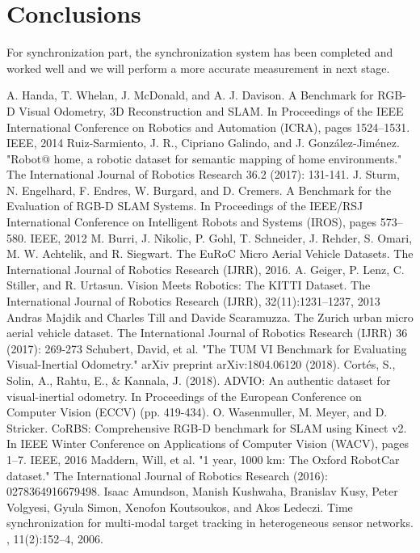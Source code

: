\documentclass[conference]{IEEEtran}
\begin{document}
	\section{Conclusions}
	For synchronization part, the synchronization system has been completed and worked well and we will perform a more accurate measurement in next stage.
	
	\begin{thebibliography}{00}
		 A. Handa, T. Whelan, J. McDonald, and A. J. Davison. A Benchmark for RGB-D Visual Odometry, 3D Reconstruction and SLAM. In Proceedings of the IEEE International Conference on Robotics and Automation (ICRA), pages 1524–1531. IEEE, 2014
		 Ruiz-Sarmiento, J. R., Cipriano Galindo, and J. González-Jiménez. "Robot@ home, a robotic dataset for semantic mapping of home environments." The International Journal of Robotics Research 36.2 (2017): 131-141.
		 J. Sturm, N. Engelhard, F. Endres, W. Burgard, and D. Cremers. A Benchmark for the Evaluation of RGB-D SLAM Systems. In Proceedings of the IEEE/RSJ International Conference on Intelligent Robots and Systems (IROS), pages 573–580. IEEE, 2012
		 M. Burri, J. Nikolic, P. Gohl, T. Schneider, J. Rehder, S. Omari, M. W. Achtelik, and R. Siegwart. The EuRoC Micro Aerial Vehicle Datasets. The International Journal of Robotics Research (IJRR), 2016.
		 A. Geiger, P. Lenz, C. Stiller, and R. Urtasun. Vision Meets Robotics: The KITTI Dataset. The International Journal of Robotics Research (IJRR), 32(11):1231–1237, 2013
		 Andras Majdik and Charles Till and Davide Scaramuzza. The Zurich urban micro aerial vehicle dataset. The International Journal of Robotics Research (IJRR) 36 (2017): 269-273
		 Schubert, David, et al. "The TUM VI Benchmark for Evaluating Visual-Inertial Odometry." arXiv preprint arXiv:1804.06120 (2018).
		 Cortés, S., Solin, A., Rahtu, E., \& Kannala, J. (2018). ADVIO: An authentic dataset for visual-inertial odometry. In Proceedings of the European Conference on Computer Vision (ECCV) (pp. 419-434).
		 O. Wasenmuller, M. Meyer, and D. Stricker. CoRBS: Comprehensive RGB-D benchmark for SLAM using Kinect v2. In IEEE Winter Conference on Applications of Computer Vision (WACV), pages 1–7. IEEE, 2016
		 Maddern, Will, et al. "1 year, 1000 km: The Oxford RobotCar dataset." The International Journal of Robotics Research (2016): 0278364916679498. 
		Isaac Amundson, Manish Kushwaha, Branislav Kusy, Peter Volgyesi, Gyula Simon,
		Xenofon Koutsoukos, and Akos Ledeczi.
		\newblock Time synchronization for multi-modal target tracking in heterogeneous
		sensor networks.
		, 11(2):152--4, 2006.
		

\end{thebibliography}
\end{document}
